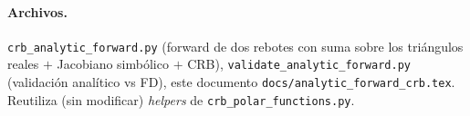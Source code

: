 \documentclass[11pt,a4paper]{article}
\theoremstyle{plain}
\theoremstyle{definition}
\begin{document}
\paragraph{Archivos.}
\texttt{crb\_analytic\_forward.py} (forward de dos rebotes con suma sobre los
tri\'angulos reales $+$ Jacobiano simb\'olico $+$ CRB),
\texttt{validate\_analytic\_forward.py} (validaci\'on anal\'itico vs FD), este
documento \texttt{docs/analytic\_forward\_crb.tex}. Reutiliza (sin modificar)
\emph{helpers} de \texttt{crb\_polar\_functions.py}.
\end{document}
